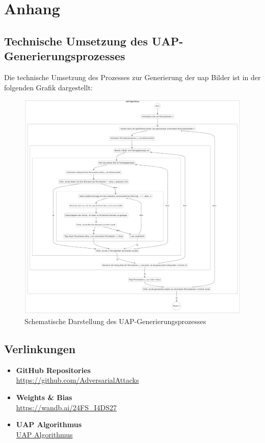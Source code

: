 \section{Anhang}

\subsection{Technische Umsetzung des UAP-Generierungsprozesses}

Die technische Umsetzung des Prozesses zur Generierung der \acrshort{uap} Bilder ist in der folgenden Grafik dargestellt:

\begin{figure}[H]
    \centering
    \includegraphics[width=13.7cm]{01-images/04-methodik/UAP_ALG.png}
    \caption{Schematische Darstellung des UAP-Generierungsprozesses}
    \label{fig:05-uap_algorithm}
\end{figure}

\newpage

\subsection{Verlinkungen}

\begin{itemize}

    \item \textbf{GitHub Repositories} \\
    \href{https://github.com/AdversarialAttacks}{https://github.com/AdversarialAttacks}
    
    \item \textbf{Weights \& Bias} \\
    \href{https://wandb.ai/24FS_I4DS27}
    {https://wandb.ai/24FS\_I4DS27}
    
    \item \textbf{UAP Algorithmus} \\
    \href{https://github.com/AdversarialAttacks/report/blob/main/01-images/05-UAP_ALG.png}{UAP Algorithmus}
    
\end{itemize}
